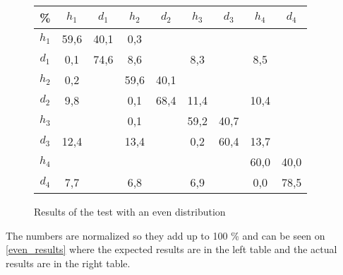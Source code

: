 \begin{figure}
	\centering
\begin{tabular}{|c | c c c c c c c c|}
\hline
\% &      $ h_1 $ & $ d_1 $ & $ h_2 $ & $ d_2 $ & $ h_3 $ & $ d_3 $ & $ h_4 $ & $ d_4 $\\
 \hline
$ h_1 $ & 59,6 &  40,1 & 0,3 &   &   &   &   &  \\
$ d_1 $ & 0,1 &  74,6 &  { \color{red} 8,6} &   &   {\color{red}8,3} &   &  {\color{red} 8,5} &  \\
$ h_2 $ & 0,2 &   &  59,6 &  40,1 &   &   &   &  \\
$ d_2 $ & {\color{blue}9,8} &   &   0,1 &  68,4 &  {\color{blue}11,4} &   &  {\color{blue}10,4} &  \\
$ h_3 $ & &   &   0,1 &   &  59,2 &  40,7 &   &  \\
$ d_3 $ & {\color{orange}12,4} &   &  {\color{orange}13,4} &   &   0,2 &  60,4 &  {\color{orange}13,7} &  \\
$ h_4 $ & &   &   &   &   &   &  60,0 &  40,0\\
$ d_4 $ & {\color{purple}7,7} &   &   {\color{purple}6,8} &   &   {\color{purple}6,9} &   &   0,0 &  78,5\\
\hline
\end{tabular}
\caption{Results of the test with an even distribution}\label{test_even}
\end{figure}

The numbers are normalized so they add up to 100 \% and can be seen on \cref{even_results} where the expected results are in the left table and the actual results are in the right table.

